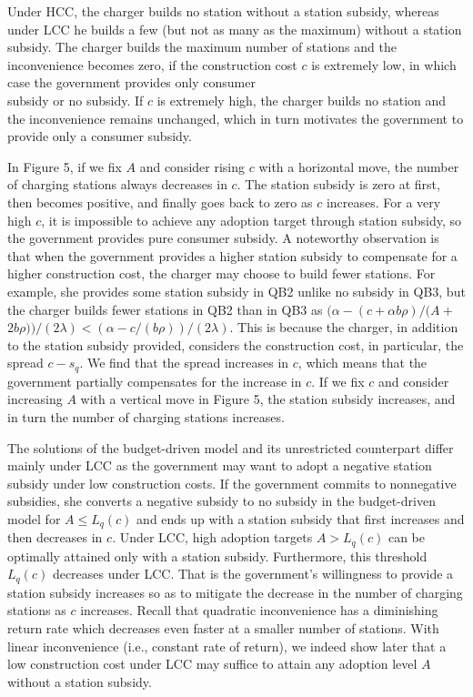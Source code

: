\documentclass[10pt]{article}
\begin{document}
Under HCC, the charger builds no station without a station subsidy, whereas under LCC he builds a few (but not as many as the maximum) without a station subsidy. The charger builds the maximum number of stations and the inconvenience becomes zero, if the construction cost $c$ is extremely low, in which case the government provides only consumer\\
subsidy or no subsidy. If $c$ is extremely high, the charger builds no station and the inconvenience remains unchanged, which in turn motivates the government to provide only a consumer subsidy.

In Figure 5, if we fix $A$ and consider rising $c$ with a horizontal move, the number of charging stations always decreases in $c$. The station subsidy is zero at first, then becomes positive, and finally goes back to zero as $c$ increases. For a very high $c$, it is impossible to achieve any adoption target through station subsidy, so the government provides pure consumer subsidy. A noteworthy observation is that when the government provides a higher station subsidy to compensate for a higher construction cost, the charger may choose to build fewer stations. For example, she provides some station subsidy in QB2 unlike no subsidy in QB3, but the charger builds fewer stations in QB2 than in QB3 as $(\alpha-(c+\alpha b \rho) /(A+$ $2 b \rho)) /(2 \lambda)<(\alpha-c /(b \rho)) /(2 \lambda)$. This is because the charger, in addition to the station subsidy provided, considers the construction cost, in particular, the spread $c-s_{q}$. We find that the spread increases in $c$, which means that the government partially compensates for the increase in $c$. If we fix $c$ and consider increasing $A$ with a vertical move in Figure 5, the station subsidy increases, and in turn the number of charging stations increases.

The solutions of the budget-driven model and its unrestricted counterpart differ mainly under LCC as the government may want to adopt a negative station subsidy under low construction costs. If the government commits to nonnegative subsidies, she converts a negative subsidy to no subsidy in the budget-driven model for $A \leq L_{q}(c)$ and ends up with a station subsidy that first increases and then decreases in $c$. Under LCC, high adoption targets $A>L_{q}(c)$ can be optimally attained only with a station subsidy. Furthermore, this threshold $L_{q}(c)$ decreases under LCC. That is the government's willingness to provide a station subsidy increases so as to mitigate the decrease in the number of charging stations as $c$ increases. Recall that quadratic inconvenience has a diminishing return rate which decreases even faster at a smaller number of stations. With linear inconvenience (i.e., constant rate of return), we indeed show later that a low construction cost under LCC may suffice to attain any adoption level $A$ without a station subsidy.
\end{document}
